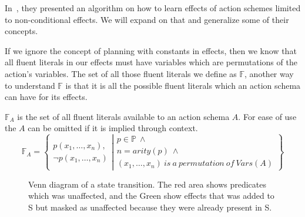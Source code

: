 \documentclass[../Master.tex]{subfiles}
\begin{document}
In~\cite{Walsh2008}, they presented an algorithm on how to learn effects of action schemes limited to non-conditional effects. We will expand on that and generalize some of their concepts.

If we ignore the concept of planning with constants in effects, then we know that all fluent literals in our effects must have variables which are permutations of the action's variables. The set of all those fluent literals we define as $\mathbb{F}$, another way to understand $\mathbb{F}$ is that it is all the possible fluent literals which an action schema can have for its effects.

\begin{definition} 
$\mathbb{F}_A$ is the set of all fluent literals available to an action schema $A$. For ease of use the $A$ can be omitted if it is implied through context.
	\begin{equation*}
		\mathbb{F}_A = \left\{ 
				\begin{gathered}
					p(x_1,\dots,x_n), \\
					\neg p(x_1,\dots,x_n)
				\end{gathered}
					\left|
				\begin{gathered} p \in \mathbb{P}~\land \\
								n = arity(p)~\land  \\
								(x_1,\dots,x_n) ~is~ a~ permutation ~ of ~Vars(A)
				\end{gathered}				
							\right.\right\}
	\end{equation*}
\end{definition}


\begin{figure}
	\def\firstcircle{(0,0) circle (1.5cm)}
	\def\secondcircle{(0:2cm) circle (1.5cm)}
	\def\thirdcircle{(0:3.8cm) circle (2.9cm)}
	\centering
\caption{\label{fig:nca:venn-of-effects} Venn diagram of a state transition. The red area shows predicates which was unaffected, and the Green show effects that was added to S but masked as unaffected because they were already present in S.}

\end{figure}
\end{document}
